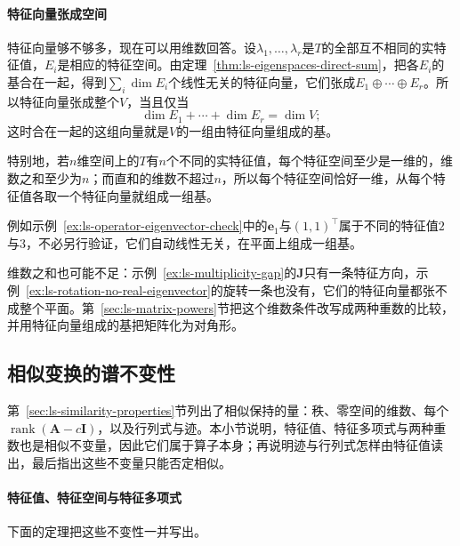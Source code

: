 \paragraph{特征向量张成空间}
特征向量够不够多，现在可以用维数回答。设$\lambda_1,\ldots,\lambda_r$是$T$的全部互不相同的实特征值，$E_i$是相应的特征空间。由定理~\ref{thm:ls-eigenspaces-direct-sum}，把各$E_i$的基合在一起，得到$\sum_i\dim E_i$个线性无关的特征向量，它们张成$E_1\oplus\cdots\oplus E_r$。所以特征向量张成整个$V$，当且仅当
\[
 \dim E_1+\cdots+\dim E_r=\dim V ;
\]
这时合在一起的这组向量就是$V$的一组由特征向量组成的基。

特别地，若$n$维空间上的$T$有$n$个不同的实特征值，每个特征空间至少是一维的，维数之和至少为$n$；而直和的维数不超过$n$，所以每个特征空间恰好一维，从每个特征值各取一个特征向量就组成一组基。

例如示例~\ref{ex:ls-operator-eigenvector-check}中的$\bm e_1$与$(1,1)^{\top}$属于不同的特征值$2$与$3$，不必另行验证，它们自动线性无关，在平面上组成一组基。

维数之和也可能不足：示例~\ref{ex:ls-multiplicity-gap}的$\bm J$只有一条特征方向，示例~\ref{ex:ls-rotation-no-real-eigenvector}的旋转一条也没有，它们的特征向量都张不成整个平面。第~\ref{sec:ls-matrix-powers}节把这个维数条件改写成两种重数的比较，并用特征向量组成的基把矩阵化为对角形。

\subsection{相似变换的谱不变性}
\label{sec:ls-eigen-similarity-invariance}

第~\ref{sec:ls-similarity-properties}节列出了相似保持的量：秩、零空间的维数、每个$\operatorname{rank}(\bm A-c\bm I)$，以及行列式与迹。本小节说明，特征值、特征多项式与两种重数也是相似不变量，因此它们属于算子本身；再说明迹与行列式怎样由特征值读出，最后指出这些不变量只能否定相似。

\paragraph{特征值、特征空间与特征多项式}
下面的定理把这些不变性一并写出。

